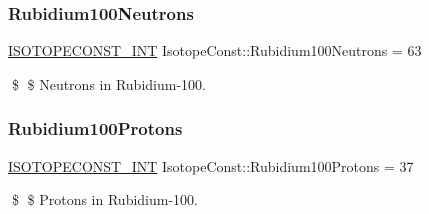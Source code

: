 \subsubsection{\texorpdfstring{Rubidium100\+Neutrons}{Rubidium100Neutrons}}
{\footnotesize\ttfamily \mbox{\hyperlink{group___isotope_const-_macros_ga5f18360b3e99483a35c32d789e62621c}{I\+S\+O\+T\+O\+P\+E\+C\+O\+N\+S\+T\+\_\+\+I\+NT}} Isotope\+Const\+::\+Rubidium100\+Neutrons = 63}

\$ \$ Neutrons in Rubidium-\/100. \mbox{\label{group___isotope_const-_rubidium-_rb100_ga90c0ff1b9036419c5a75beedb9e97a21}} 
\subsubsection{\texorpdfstring{Rubidium100\+Protons}{Rubidium100Protons}}
{\footnotesize\ttfamily \mbox{\hyperlink{group___isotope_const-_macros_ga5f18360b3e99483a35c32d789e62621c}{I\+S\+O\+T\+O\+P\+E\+C\+O\+N\+S\+T\+\_\+\+I\+NT}} Isotope\+Const\+::\+Rubidium100\+Protons = 37}

\$ \$ Protons in Rubidium-\/100. 